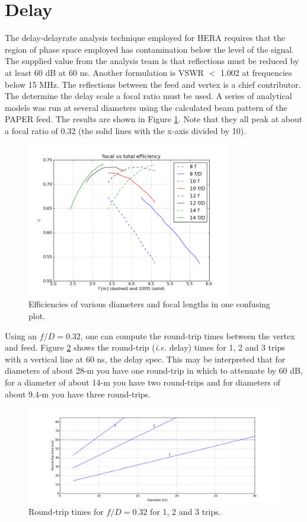 \documentclass[11pt]{article}
\begin{document}
\section{Delay}
The delay-delayrate analysis technique employed for HERA requires that the region of phase space employed has contamination below the level of the signal.  The supplied value from the analysis team is that reflections must be reduced by at least 60 dB at 60 ns.  Another formulation is VSWR $<$ 1.002 at frequencies below 15 MHz.  The reflections between the feed and vertex is a chief contributor.  The determine the delay scale a focal ratio must be used.  A series of analytical models was run at several diameters using the calculated beam pattern of the PAPER feed.  The results are shown in Figure \ref{fig:efficiency}.  Note that they all peak at about a focal ratio of 0.32 (the solid lines with the x-axis divided by 10).

\begin{figure}[h]
\centering
\includegraphics[width=0.8\textwidth]{heraDishfDplot.png}
\caption{Efficiencies of various diameters and focal lengths in one confusing plot.}
\label{fig:efficiency}
\end{figure}

Using an $f/D=0.32$, one can compute the round-trip times between the vertex and feed.  Figure \ref{fig:roundtrip} shows the round-trip ({\em i.e.} delay) times for 1, 2 and 3 trips with a vertical line at 60 ns, the delay spec.  This may be interpreted that for diameters of about 28-m you have one round-trip in which to attenuate by 60 dB, for a diameter of about 14-m  you have two round-trips and for diameters of about 9.4-m you have three round-trips. 
\begin{figure}[h]
\centering
\includegraphics[width=1.0\textwidth]{roundtrip.png}
\caption{Round-trip times for $f/D=0.32$ for 1, 2 and 3 trips.}
\label{fig:roundtrip}
\end{figure}
\end{document}
